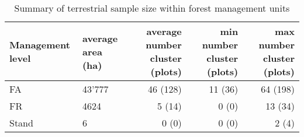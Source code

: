 \begin{table}[ht]
\centering
\caption{Summary of terrestrial sample size within forest management units}
\label{tab:adj_r2_within}
\begin{tabular}{llrrr}
  \hline
Management level & average area (ha) & average number cluster (plots) & min number cluster (plots) & max number cluster (plots)\\ 
  \hline
 FA   & 43'777 & 46 (128) & 11 (36) &  64 (198) \\ 
 FR   & 4624 & 5 (14) & 0 (0)  & 13 (34) \\ 
 Stand & 6 & 0 (0) & 0 (0) & 2 (4) \\ 
   \hline
\hline
\end{tabular}
\end{table}

